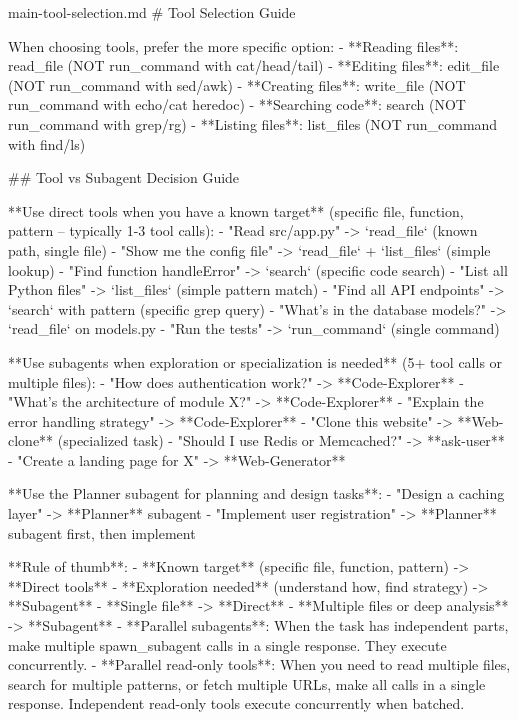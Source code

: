 \begin{prompttemplate}{main-tool-selection.md}
# Tool Selection Guide

When choosing tools, prefer the more specific option:
- **Reading files**: read_file (NOT run_command with cat/head/tail)
- **Editing files**: edit_file (NOT run_command with sed/awk)
- **Creating files**: write_file (NOT run_command with echo/cat heredoc)
- **Searching code**: search (NOT run_command with grep/rg)
- **Listing files**: list_files (NOT run_command with find/ls)

## Tool vs Subagent Decision Guide

**Use direct tools when you have a known target** (specific file, function,
pattern -- typically 1-3 tool calls):
- "Read src/app.py" -> `read_file` (known path, single file)
- "Show me the config file" -> `read_file` + `list_files` (simple lookup)
- "Find function handleError" -> `search` (specific code search)
- "List all Python files" -> `list_files` (simple pattern match)
- "Find all API endpoints" -> `search` with pattern (specific grep query)
- "What's in the database models?" -> `read_file` on models.py
- "Run the tests" -> `run_command` (single command)

**Use subagents when exploration or specialization is needed** (5+ tool
calls or multiple files):
- "How does authentication work?" -> **Code-Explorer**
- "What's the architecture of module X?" -> **Code-Explorer**
- "Explain the error handling strategy" -> **Code-Explorer**
- "Clone this website" -> **Web-clone** (specialized task)
- "Should I use Redis or Memcached?" -> **ask-user**
- "Create a landing page for X" -> **Web-Generator**

**Use the Planner subagent for planning and design tasks**:
- "Design a caching layer" -> **Planner** subagent
- "Implement user registration" -> **Planner** subagent first, then implement

**Rule of thumb**:
- **Known target** (specific file, function, pattern) -> **Direct tools**
- **Exploration needed** (understand how, find strategy) -> **Subagent**
- **Single file** -> **Direct**
- **Multiple files or deep analysis** -> **Subagent**
- **Parallel subagents**: When the task has independent parts, make multiple
  spawn_subagent calls in a single response. They execute concurrently.
- **Parallel read-only tools**: When you need to read multiple files, search
  for multiple patterns, or fetch multiple URLs, make all calls in a single
  response. Independent read-only tools execute concurrently when batched.
\end{prompttemplate}

